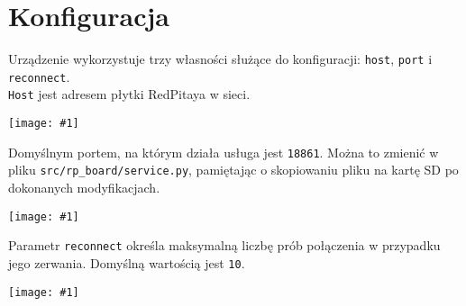 \documentclass[12pt,a4paper]{article}
\newcommand{\screenshot}[1]{\begin{minipage}[c]{\textwidth}\texttt{[image: \#1]}\end{minipage}}
\begin{document}
	\section{Konfiguracja}
	Urządzenie wykorzystuje trzy własności służące do konfiguracji: \texttt{host}, \texttt{port} i \texttt{reconnect}.\\
	\texttt{Host} jest adresem płytki RedPitaya w sieci.\\
	\screenshot{screenshots/host.png}
	Domyślnym portem, na którym działa usługa jest \texttt{18861}. Można to zmienić w pliku \texttt{src/rp\_board/service.py}, pamiętając o skopiowaniu pliku na kartę SD po dokonanych modyfikacjach.\\
	\screenshot{screenshots/port.png}
	Parametr \texttt{reconnect} określa maksymalną liczbę prób połączenia w przypadku jego zerwania. Domyślną wartością jest \texttt{10}.\\
	\screenshot{screenshots/reconnect.png}
\end{document}
